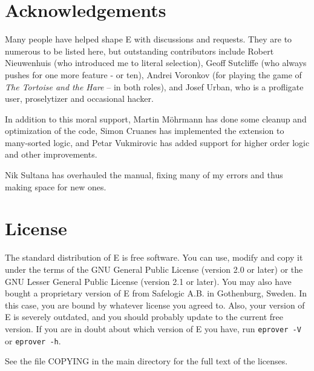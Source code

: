 \documentclass{report}
\begin{document}
\clearpage
\begin{appendix}
  \chapter{Acknowledgements}

   Many people have helped shape E with
  discussions and requests. They are to numerous to be listed here,
  but outstanding contributors include Robert Nieuwenhuis (who
  introduced me to literal selection), Geoff Sutcliffe (who always
  pushes for one more feature - or ten), Andrei Voronkov (for playing
  the game of \emph{The Tortoise and the Hare} -- in both roles), and
  Josef Urban, who is a profligate user, proselytizer and occasional
  hacker.

  In addition to this moral support, Martin M\"ohrmann has done some
  cleanup and optimization of the code, Simon Cruanes has implemented
  the extension to many-sorted logic, and Petar Vukmirovic has added
  support for higher order logic and other improvements.

  Nik Sultana has overhauled the manual, fixing many of my errors and
  thus making space for new ones.

  \chapter{License}

   The standard distribution of E is free software. You
  can use, modify and copy it under the terms of the GNU General
  Public License (version 2.0 or later) or the GNU Lesser General
  Public License (version 2.1 or later). You may also have bought a
  proprietary version of E from Safelogic A.B. in Gothenburg,
  Sweden. In this case, you are bound by whatever license you agreed
  to. Also, your version of E is severely outdated, and you should
  probably update to the current free version. If you are in doubt
  about which version of E you have, run \texttt{eprover -V} or
  \texttt{eprover -h}.

  See the file COPYING in the main directory for the full text of the
  licenses.
\end{appendix}
\end{document}
